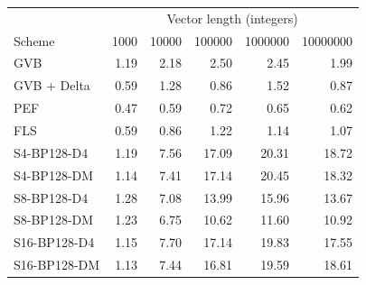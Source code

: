 \begin{tabular}{lrrrrr}
\toprule
 & \multicolumn{5}{c}{Vector length (integers)} \\
Scheme & 1000 & 10000 & 100000 & 1000000 & 10000000 \\
\midrule
GVB & 1.19 & 2.18 & 2.50 & 2.45 & 1.99 \\
GVB + Delta & 0.59 & 1.28 & 0.86 & 1.52 & 0.87 \\
PEF & 0.47 & 0.59 & 0.72 & 0.65 & 0.62 \\
FLS & 0.59 & 0.86 & 1.22 & 1.14 & 1.07 \\
S4-BP128-D4 & 1.19 & 7.56 & 17.09 & 20.31 & 18.72 \\
S4-BP128-DM & 1.14 & 7.41 & 17.14 & 20.45 & 18.32 \\
S8-BP128-D4 & 1.28 & 7.08 & 13.99 & 15.96 & 13.67 \\
S8-BP128-DM & 1.23 & 6.75 & 10.62 & 11.60 & 10.92 \\
S16-BP128-D4 & 1.15 & 7.70 & 17.14 & 19.83 & 17.55 \\
S16-BP128-DM & 1.13 & 7.44 & 16.81 & 19.59 & 18.61 \\
\bottomrule
\end{tabular}

